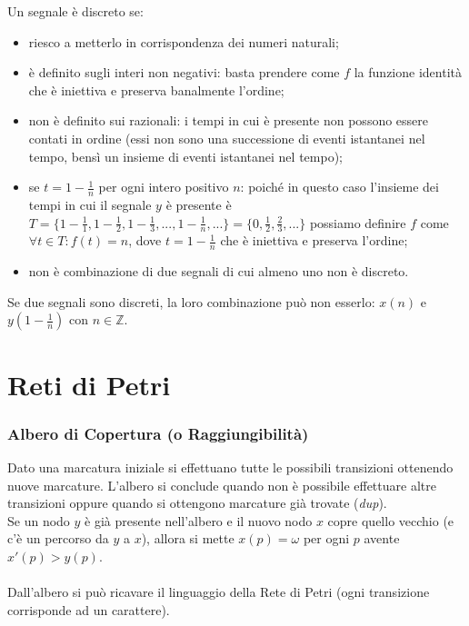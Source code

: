 \documentclass[a4paper, notitlepage, 10pt]{report}
\begin{document}
Un segnale è discreto se:
\begin{itemize}
	\item riesco a metterlo in corrispondenza dei numeri naturali;
	\item è definito sugli interi non negativi: basta prendere come $f$ la funzione identità che è iniettiva e preserva banalmente l’ordine;
	\item non è definito sui razionali: i tempi in cui è presente non possono essere contati in ordine (essi non sono una successione di eventi istantanei nel tempo, bensì un insieme di eventi istantanei nel tempo);
	\item se $t = 1 - \frac{1}{n}$ per ogni intero positivo $n$: poiché in questo caso l’insieme dei tempi in cui il segnale $y$ è presente è $T = \{1-\frac{1}{1},1-\frac{1}{2},1-\frac{1}{3},...,1-\frac{1}{n},...\}= \{0, \frac{1}{2}, \frac{2}{3}, . . . \}$ possiamo definire $f$ come $\forall t\in T : f(t)=n$, dove $t=1-\frac{1}{n}$ che è iniettiva e preserva l’ordine;
	\item non è combinazione di due segnali di cui almeno uno non è discreto.
\end{itemize}

\noindent
Se due segnali sono discreti, la loro combinazione può non esserlo: $x(n)$ e $y(1 - \frac{1}{n})$ con $n\in \mathbb{Z}$.

{\let\clearpage\relax \chapter*{Reti di Petri}}


\subsection*{Albero di Copertura (o Raggiungibilità)}
Dato una marcatura iniziale si effettuano tutte le possibili transizioni ottenendo nuove marcature.
L'albero si conclude quando non è possibile effettuare altre transizioni oppure quando si ottengono marcature già trovate (\textit{dup}).
\\
Se un nodo $y$ è già presente nell'albero e il nuovo nodo $x$ copre quello vecchio (e c'è un percorso da $y$ a $x$), allora si mette $x(p)=\omega$ per ogni $p$ avente $x'(p)>y(p)$.
\\\\
Dall'albero si può ricavare il linguaggio della Rete di Petri (ogni transizione corrisponde ad un carattere).
\end{document}
